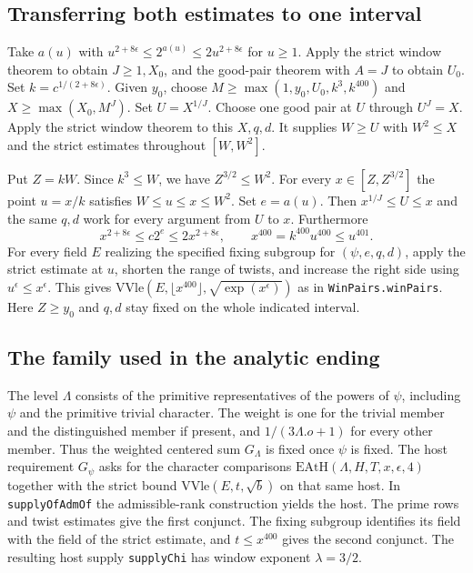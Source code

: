 \subsection{Transferring both estimates to one interval}

Take $a(u)$ with $u^{2+8\epsilon}\le2^{a(u)}\le2u^{2+8\epsilon}$ for
$u\ge1$. Apply the strict window theorem to obtain $J\ge1,X_0$, and
the good-pair theorem with $A=J$ to obtain $U_0$. Set
$k=c^{1/(2+8\epsilon)}$. Given $y_0$, choose
$M\ge\max(1,y_0,U_0,k^3,k^{400})$ and $X\ge\max(X_0,M^J)$.
Set $U=X^{1/J}$. Choose one good pair at $U$ through $U^J=X$.
Apply the strict window theorem to this $X,q,d$. It supplies $W\ge U$
with $W^2\le X$ and the strict estimates throughout $[W,W^2]$.

Put $Z=kW$. Since $k^3\le W$, we have $Z^{3/2}\le W^2$. For every
$x\in[Z,Z^{3/2}]$ the point $u=x/k$ satisfies $W\le u\le x\le W^2$.
Set $e=a(u)$. Then $x^{1/J}\le U\le x$ and the same $q,d$ work for
every argument from $U$ to $x$. Furthermore
\[
 x^{2+8\epsilon}\le c2^e\le2x^{2+8\epsilon},
 \qquad x^{400}=k^{400}u^{400}\le u^{401}.
\]
For every field $E$ realizing the specified fixing subgroup for
$(\psi,e,q,d)$, apply the strict estimate at $u$, shorten the range
of twists, and increase the right side using $u^\epsilon\le x^\epsilon$.
This gives $\mathrm{VVle}(E,\lfloor x^{400}\rfloor,
\sqrt{\exp(x^\epsilon)})$ as in \texttt{WinPairs.winPairs}.
Here $Z\ge y_0$ and $q,d$ stay fixed on the whole indicated interval.

\subsection{The family used in the analytic ending}

The level $\Lambda$ consists of the primitive representatives of the
powers of $\psi$, including $\psi$ and the primitive trivial character.
The weight is one for the trivial member and the distinguished member
if present, and $1/(3\Lambda.o+1)$ for every other member. Thus the
weighted centered sum $G_\Lambda$ is fixed once $\psi$ is fixed. The
host requirement $G_\psi$ asks for the character comparisons
$\mathrm{EAtH}(\Lambda,H,T,x,\epsilon,4)$ together with the strict
bound $\mathrm{VVle}(E,t,\sqrt b)$ on that same host. In
\texttt{supplyOfAdmOf} the admissible-rank construction yields the
host. The prime rows and twist estimates give the first conjunct.
The fixing subgroup identifies its field with the field of the strict
estimate, and $t\le x^{400}$ gives the second conjunct. The resulting
host supply \texttt{supplyChi} has window exponent $\lambda=3/2$.

